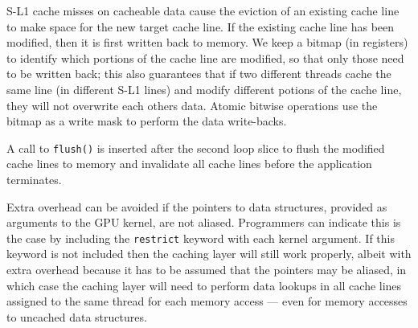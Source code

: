 %

\noindent
S-L1 cache misses on cacheable data cause the eviction of an existing cache line to make space for the new target cache line.
If the existing cache line has been modified, then it is first written back to memory.
We keep a bitmap (in registers) to identify which portions of the cache line are modified, so that only those need
to be written back; 
this also guarantees that if two different threads cache the same line (in different  S-L1 lines) and
modify different potions of the cache line, they will not overwrite each others data.
Atomic bitwise operations use the bitmap as a write mask to perform the data write-backs.

A call to \texttt{flush()} is inserted after the second loop slice to flush the modified cache lines to memory and invalidate all cache lines before the application terminates.

Extra overhead can be avoided if the pointers to data structures, provided as arguments to the GPU
kernel, are not aliased. 
Programmers can indicate this is the case by including the \texttt{restrict} keyword with each
kernel argument. 
If this keyword is not included then the caching layer will still work properly, albeit 
with extra overhead because it has to be assumed that the pointers may be aliased,
in which case the caching layer will need to perform data lookups in all cache lines assigned to the same thread for
each memory access --- even for memory accesses to uncached data structures.



